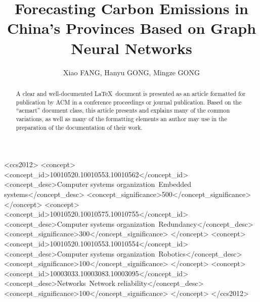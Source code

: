 \documentclass[sigconf, authordraft]{acmart}
\begin{document}
	\title{Forecasting Carbon Emissions in China's Provinces Based on Graph Neural Networks}



	\author{Xiao FANG, Hanyu GONG, Mingze GONG}
	
	\renewcommand{\shortauthors}{Trovato and Tobin, et al.}


	\begin{abstract}
		A clear and well-documented \LaTeX\ document is presented as an article formatted
		for publication by ACM in a conference proceedings or journal publication.
		Based on the ``acmart'' document class, this article presents and explains many
		of the common variations, as well as many of the formatting elements an
		author may use in the preparation of the documentation of their work.
	\end{abstract}

	\begin{CCSXML}
		<ccs2012> <concept> <concept_id>10010520.10010553.10010562</concept_id> <concept_desc>Computer
		systems organization~Embedded systems</concept_desc> <concept_significance>500</concept_significance>
		</concept> <concept> <concept_id>10010520.10010575.10010755</concept_id> <concept_desc>Computer
		systems organization~Redundancy</concept_desc> <concept_significance>300</concept_significance>
		</concept> <concept> <concept_id>10010520.10010553.10010554</concept_id> <concept_desc>Computer
		systems organization~Robotics</concept_desc> <concept_significance>100</concept_significance>
		</concept> <concept> <concept_id>10003033.10003083.10003095</concept_id> <concept_desc>Networks~Network
		reliability</concept_desc> <concept_significance>100</concept_significance>
		</concept> </ccs2012>
	\end{CCSXML}
\end{document}
